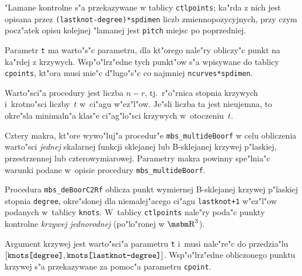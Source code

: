 "Lamane kontrolne s"a przekazywane w tablicy \texttt{ctlpoints}; ka"rda z
nich jest opisana przez \texttt{(lastknot-degree)*spdimen} liczb
zmiennopozycyjnych, przy czym pocz"atek opisu kolejnej "lamanej jest
\texttt{pitch} miejsc po poprzedniej.

Parametr \texttt{t} ma warto"s"c parametru, dla kt"orego nale"ry obliczy"c
punkt na ka"rdej z krzywych. Wsp"o"lrz"edne tych punkt"ow s"a wpisywane do
tablicy \texttt{cpoints}, kt"ora musi mie"c d"lugo"s"c co najmniej
\texttt{ncurves*spdimen}.

Warto"sci"a procedury jest liczba $n-r$, tj.\ r"o"rnica stopnia krzywych
i~krotno"sci liczby~$t$ w~ci"agu w"ez"l"ow. Je"sli liczba ta jest nieujemna,
to okre"sla minimaln"a klas"e ci"ag"lo"sci krzywych w~otoczeniu~$t$.

\vspace{\bigskipamount}
Cztery makra, kt"ore wywo"luj"a procedur"e \texttt{mbs\_multideBoorf} w celu
obliczenia warto"sci \emph{jednej} skalarnej funkcji sklejanej lub
B-sklejanej krzywej p"laskiej, przestrzennej lub czterowymiarowej. Parametry
makra powinny spe"lnia"c warunki podane w~opisie procedury
\texttt{mbs\_multideBoorf}.

\vspace{\bigskipamount}
\begin{sloppypar}
Procedura \texttt{mbs\_deBoorC2Rf} oblicza punkt wymiernej B-sklejanej
krzywej p"las\-kiej stopnia \texttt{degree}, okre"slonej dla
niemalej"acego ci"agu \texttt{lastknot+1} w"ez"l"ow podanych w~tablicy
\texttt{knots}. W~tablicy \texttt{ctlpoints} nale"ry poda"c punkty kontrolne
\emph{krzywej jednorodnej} (po"lo"ronej w $\R^3$).

Argument krzywej jest warto"sci"a parametru \texttt{t} i~musi nale"re"c
do przedzia"lu
$[\mbox{\texttt{knots[degree]}},\mbox{\texttt{knots[lastknot-degree]}}]$.
Wsp"o"l\-rz"ed\-ne obliczonego punktu
krzywej s"a przekazywane za pomoc"a parametru \texttt{cpoint}.
\end{sloppypar}

